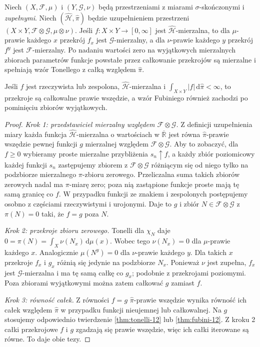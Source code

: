 \begin{twierdzenie}
\label{thm:completed-product-fubini-12}
Niech $(X,\mathcal F,\mu)$ i $(Y,\mathcal G,\nu)$
będą przestrzeniami z miarami $\sigma$-skończonymi
i \emph{zupełnymi}. Niech $(\widehat{\mathcal H},
\widehat\pi)$ będzie uzupełnieniem przestrzeni
$(X\times Y,\mathcal F\otimes\mathcal G,\mu\otimes\nu)$.
Jeśli $f:X\times Y\to[0,\infty]$ jest
$\widehat{\mathcal H}$-mierzalna, to dla $\mu$-prawie
każdego $x$ przekrój $f_x$ jest $\mathcal G$-mierzalny,
a dla $\nu$-prawie każdego $y$ przekrój $f^y$ jest
$\mathcal F$-mierzalny. Po nadaniu wartości zero
na wyjątkowych mierzalnych zbiorach parametrów
funkcje powstałe przez całkowanie przekrojów są
mierzalne i spełniają wzór Tonellego z całką
względem $\widehat\pi$.

Jeśli $f$ jest rzeczywista lub zespolona,
$\widehat{\mathcal H}$-mierzalna i
$\int_{X\times Y}|f|\,\mathrm d\widehat\pi<\infty$,
to przekroje są całkowalne prawie wszędzie,
a wzór Fubiniego również zachodzi po pominięciu
zbiorów wyjątkowych.
\end{twierdzenie}
\begin{proof}
\emph{Krok 1: przedstawiciel mierzalny względem
$\mathcal F\otimes\mathcal G$.}
Z definicji uzupełnienia miary każda funkcja
$\widehat{\mathcal H}$-mierzalna o wartościach
w $\overline{\mathbb R}$ jest równa
$\widehat\pi$-prawie wszędzie pewnej funkcji
$g$ mierzalnej względem $\mathcal F\otimes\mathcal G$.
Aby to zobaczyć, dla $f\ge0$ wybieramy proste
mierzalne przybliżenia $s_n\uparrow f$, a każdy
zbiór poziomicowy każdej funkcji $s_n$ zastępujemy
zbiorem z $\mathcal F\otimes\mathcal G$ różniącym
się od niego tylko na podzbiorze mierzalnego
$\pi$-zbioru zerowego. Przeliczalna suma takich
zbiorów zerowych nadal ma $\pi$-miarę zero;
poza nią zastąpione funkcje proste mają tę samą
granicę co $f$. W przypadku funkcji ze znakiem
i zespolonych postępujemy osobno z częściami
rzeczywistymi i urojonymi. Daje to $g$ i zbiór
$N\in\mathcal F\otimes\mathcal G$ z $\pi(N)=0$
taki, że $f=g$ poza $N$.

\emph{Krok 2: przekroje zbioru zerowego.}
Tonelli dla $\chi_N$ daje
$0=\pi(N)=\int_X\nu(N_x)\,\mathrm d\mu(x)$.
Wobec tego $\nu(N_x)=0$ dla $\mu$-prawie każdego
$x$. Analogicznie $\mu(N^y)=0$ dla $\nu$-prawie
każdego $y$. Dla takich $x$ przekroje $f_x$ i $g_x$
różnią się jedynie na podzbiorze $N_x$.
Ponieważ $\nu$ jest zupełna, $f_x$ jest
$\mathcal G$-mierzalna i ma tę samą całkę co $g_x$;
podobnie z przekrojami poziomymi. Poza zbiorami
wyjątkowymi można zatem całkować $g$ zamiast $f$.

\emph{Krok 3: równość całek.}
Z równości $f=g$ $\widehat\pi$-prawie wszędzie
wynika równość ich całek względem $\widehat\pi$
w przypadku funkcji nieujemnej lub całkowalnej.
Na $g$ stosujemy odpowiednio twierdzenie
\ref{thm:tonelli-12} lub \ref{thm:fubini-12}.
Z kroku 2 całki przekrojowe $f$ i $g$ zgadzają
się prawie wszędzie, więc ich całki iterowane
są równe. To daje obie tezy.
\end{proof}

